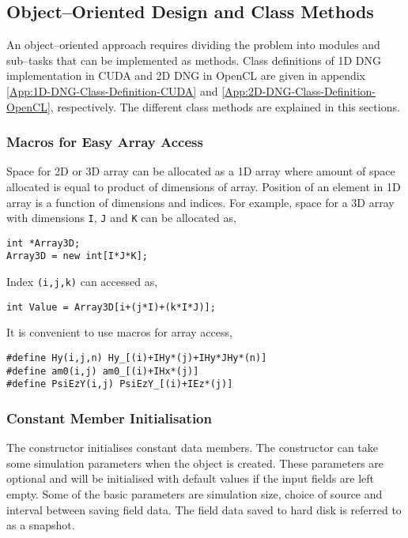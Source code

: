 \subsection{Object--Oriented Design and Class Methods}
An object--oriented approach requires dividing the problem into modules and sub--tasks that can be implemented as methods. Class definitions of 1D DNG implementation in CUDA and 2D DNG in OpenCL are given in appendix \ref{App:1D-DNG-Class-Definition-CUDA} and \ref{App:2D-DNG-Class-Definition-OpenCL}, respectively. The different class methods are explained in this sections.
\subsubsection{Macros for Easy Array Access}
Space for 2D or 3D array can be allocated as a 1D array where amount of space allocated is equal to product of dimensions of array. Position of an element in 1D array is a function of dimensions and indices. For example, space for a 3D array with dimensions \texttt{I}, \texttt{J} and \texttt{K} can be allocated as,
\label{lst:3D-Array-Allocation}
\begin{lstlisting}[caption={3D array allocation}]
int *Array3D;
Array3D = new int[I*J*K];
\end{lstlisting}
Index \texttt{(i,j,k)} can accessed as,
\label{lst:3D-Array-Access}
\begin{lstlisting}[caption={Accessing elements of 3D array}]
int Value = Array3D[i+(j*I)+(k*I*J)];
\end{lstlisting}
It is convenient to use macros for array access,
\label{lst:Array=Access-Macro}
\begin{lstlisting}[caption={Macro to access array elements}]
#define Hy(i,j,n) Hy_[(i)+IHy*(j)+IHy*JHy*(n)]
#define am0(i,j) am0_[(i)+IHx*(j)]
#define PsiEzY(i,j) PsiEzY_[(i)+IEz*(j)]
\end{lstlisting}
\subsubsection{Constant Member Initialisation}
The constructor initialises constant data members. The constructor can take some simulation parameters when the object is created. These parameters are optional and will be initialised with default values if the input fields are left empty. Some of the  basic parameters are simulation size, choice of source and interval between saving field data. The field data saved to hard disk is referred to as a snapshot.
